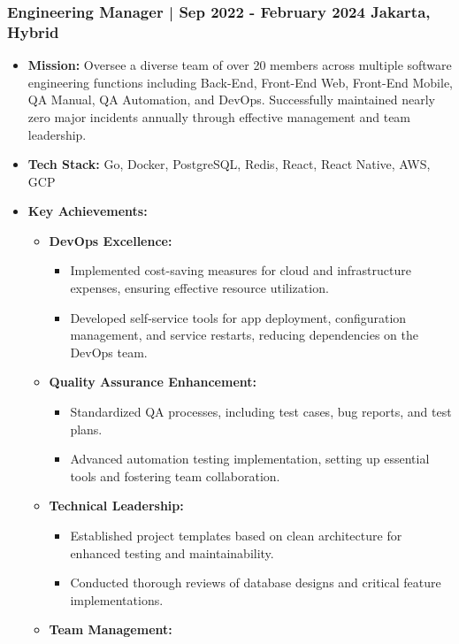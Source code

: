 \documentclass[11pt]{article}
\begin{document}
\subsubsection{Engineering Manager | Sep 2022 - February 2024 \hfill Jakarta, Hybrid}
\begin{itemize}
    \item \textbf{Mission:} Oversee a diverse team of over 20 members across multiple software engineering functions including Back-End, Front-End Web, Front-End Mobile, QA Manual, QA Automation, and DevOps. Successfully maintained nearly zero major incidents annually through effective management and team leadership.
    \item \textbf{Tech Stack:} Go, Docker, PostgreSQL, Redis, React, React Native, AWS, GCP
    \item \textbf{Key Achievements:}
    \begin{itemize}
        \item \textbf{DevOps Excellence:}
        \begin{itemize}
            \item Implemented cost-saving measures for cloud and infrastructure expenses, ensuring effective resource utilization.
            \item Developed self-service tools for app deployment, configuration management, and service restarts, reducing dependencies on the DevOps team.
        \end{itemize}
        \item \textbf{Quality Assurance Enhancement:}
        \begin{itemize}
            \item Standardized QA processes, including test cases, bug reports, and test plans.
            \item Advanced automation testing implementation, setting up essential tools and fostering team collaboration.
        \end{itemize}
        \item \textbf{Technical Leadership:}
        \begin{itemize}
            \item Established project templates based on clean architecture for enhanced testing and maintainability.
            \item Conducted thorough reviews of database designs and critical feature implementations.
        \end{itemize}
        \item \textbf{Team Management:}

\end{itemize}
\end{itemize}
\end{document}

